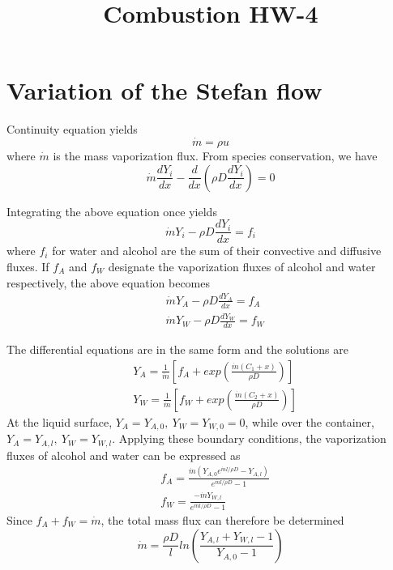 \documentclass{article}
\title{Combustion HW-4}
\author{}
\date{}
\begin{document}
\maketitle

\section{Variation of the Stefan flow}
Continuity equation yields
\begin{equation}
    \dot{m} = \rho u
\end{equation}
where $\dot{m}$ is the mass vaporization flux. From species conservation, we have
\begin{equation}
    \dot{m}\frac{dY_i}{dx}-\frac{d}{dx}(\rho D \frac{dY_i}{dx})=0
\end{equation}

Integrating the above equation once yields
\begin{equation}
    \dot{m} Y_i-\rho D \frac{dY_i}{dx}=f_i
\end{equation}
where $f_i$ for water and alcohol are the sum of their convective and diffusive fluxes. If $f_A$ and $f_W$ designate the vaporization fluxes of alcohol and water respectively, the above equation becomes
\begin{equation}
\begin{aligned}
    & \dot{m} Y_A-\rho D \frac{dY_A}{dx}=f_A \\
    & \dot{m} Y_W-\rho D \frac{dY_W}{dx}=f_W
\end{aligned}
\end{equation}

The differential equations are in the same form and the solutions are
\begin{equation}
\begin{aligned}
    & Y_A = \frac{1}{\dot{m}}[f_A+exp(\frac{\dot{m}(C_1+x)}{\rho D})] \\
    & Y_W = \frac{1}{\dot{m}}[f_W+exp(\frac{\dot{m}(C_2+x)}{\rho D})]
\end{aligned}
\end{equation}
At the liquid surface, $Y_A=Y_{A,0},\ Y_W=Y_{W,0}=0$, while over the container, $Y_A=Y_{A,l},\ Y_W=Y_{W,l}$. Applying these boundary conditions, the vaporization fluxes of alcohol and water can be expressed as
\begin{equation}
\begin{aligned}
    & f_A=\frac{\dot{m}(Y_{A,0}e^{\dot{m}l/\rho D}-Y_{A,l})}{e^{\dot{m}l/\rho D}-1} \\
    & f_W=\frac{-\dot{m}Y_{W,l}}{e^{\dot{m}l/\rho D}-1}
\end{aligned}
\end{equation}
Since $f_A+f_W=\dot{m}$, the total mass flux can therefore be determined
\begin{equation}
    \dot{m}=\frac{\rho D}{l}ln(\frac{Y_{A,l}+Y_{W,l}-1}{Y_{A,0}-1})
\end{equation}
\end{document}
